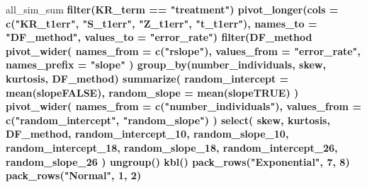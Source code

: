 \documentclass[12pt, twoside]{amherstthesis}
\newenvironment{Shaded}{\begin{snugshade}}{\end{snugshade}}
\newcommand{\DataTypeTok}[1]{\textcolor[rgb]{0.13,0.29,0.53}{#1}}
\newcommand{\DecValTok}[1]{\textcolor[rgb]{0.00,0.00,0.81}{#1}}
\newcommand{\KeywordTok}[1]{\textcolor[rgb]{0.13,0.29,0.53}{\textbf{#1}}}
\newcommand{\NormalTok}[1]{#1}
\newcommand{\OperatorTok}[1]{\textcolor[rgb]{0.81,0.36,0.00}{\textbf{#1}}}
\newcommand{\StringTok}[1]{\textcolor[rgb]{0.31,0.60,0.02}{#1}}
\begin{document}
\begin{Shaded}
\begin{Highlighting}[]
{{{{{{{{{{{{{{{{{{{{{{{{{{{{{{{{\NormalTok{all_sim_sum }\OperatorTok{%>%}
\StringTok{  }\KeywordTok{filter}\NormalTok{(KR_term }\OperatorTok{==}\StringTok{ "treatment"}\NormalTok{) }\OperatorTok{%>%}
\StringTok{  }\KeywordTok{pivot_longer}\NormalTok{(}\DataTypeTok{cols =} \KeywordTok{c}\NormalTok{(}\StringTok{"KR_t1err"}\NormalTok{, }\StringTok{"S_t1err"}\NormalTok{, }\StringTok{"Z_t1err"}\NormalTok{, }\StringTok{"t_t1err"}\NormalTok{), }
               \DataTypeTok{names_to =} \StringTok{"DF_method"}\NormalTok{, }\DataTypeTok{values_to =} \StringTok{"error_rate"}\NormalTok{) }\OperatorTok{%>%}
\StringTok{  }\KeywordTok{filter}\NormalTok{(DF_method }\OperatorTok{%in%}\StringTok{ }\KeywordTok{c}\NormalTok{(}\StringTok{"KR_t1err"}\NormalTok{, }\StringTok{"S_t1err"}\NormalTok{)) }\OperatorTok{%>%}
\StringTok{  }\KeywordTok{pivot_wider}\NormalTok{(}
    \DataTypeTok{names_from =} \KeywordTok{c}\NormalTok{(}\StringTok{"rslope"}\NormalTok{),}
    \DataTypeTok{values_from =} \StringTok{"error_rate"}\NormalTok{, }\DataTypeTok{names_prefix =} \StringTok{"slope"}
\NormalTok{  ) }\OperatorTok{%>%}
\StringTok{  }\KeywordTok{group_by}\NormalTok{(number_individuals, skew, kurtosis, DF_method) }\OperatorTok{%>%}
\StringTok{  }\KeywordTok{summarize}\NormalTok{(}
    \DataTypeTok{random_intercept =} \KeywordTok{mean}\NormalTok{(slopeFALSE),}
    \DataTypeTok{random_slope =} \KeywordTok{mean}\NormalTok{(slopeTRUE)}
\NormalTok{  ) }\OperatorTok{%>%}
\StringTok{  }\KeywordTok{pivot_wider}\NormalTok{(}
    \DataTypeTok{names_from =} \KeywordTok{c}\NormalTok{(}\StringTok{"number_individuals"}\NormalTok{),}
    \DataTypeTok{values_from =} \KeywordTok{c}\NormalTok{(}\StringTok{"random_intercept"}\NormalTok{, }\StringTok{"random_slope"}\NormalTok{)}
\NormalTok{  ) }\OperatorTok{%>%}
\StringTok{  }\KeywordTok{select}\NormalTok{(}
\NormalTok{    skew, kurtosis, DF_method, random_intercept_}\DecValTok{10}\NormalTok{, random_slope_}\DecValTok{10}\NormalTok{, }
\NormalTok{    random_intercept_}\DecValTok{18}\NormalTok{,}
\NormalTok{    random_slope_}\DecValTok{18}\NormalTok{, random_intercept_}\DecValTok{26}\NormalTok{, random_slope_}\DecValTok{26}
\NormalTok{  ) }\OperatorTok{%>%}
\StringTok{  }\KeywordTok{ungroup}\NormalTok{() }\OperatorTok{%>%}
\StringTok{  }\KeywordTok{kbl}\NormalTok{() }\OperatorTok{%>%}
\StringTok{  }\KeywordTok{pack_rows}\NormalTok{(}\StringTok{"Exponential"}\NormalTok{, }\DecValTok{7}\NormalTok{, }\DecValTok{8}\NormalTok{) }\OperatorTok{%>%}
\StringTok{  }\KeywordTok{pack_rows}\NormalTok{(}\StringTok{"Normal"}\NormalTok{, }\DecValTok{1}\NormalTok{, }\DecValTok{2}\NormalTok{) }\OperatorTok{%>%}
}}}}}}}}}}}}}}}}}}}}}}}}}}}}}}}}}}}}}}}}}}}}}
\end{Highlighting}
\end{Shaded}
\end{document}
